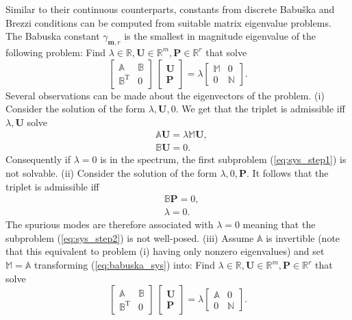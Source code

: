 \documentclass[a4paper,10pt]{article}
\newcommand{\R}{\ensuremath{\mathbb{R}}}
\newcommand{\mm}{\ensuremath{\mathbf{m}}}
\newcommand{\Amat}{\ensuremath{\mathbb{A}}}
\newcommand{\Bmat}{\ensuremath{\mathbb{B}}}
\newcommand{\Mmat}{\ensuremath{\mathbb{M}}}
\newcommand{\Nmat}{\ensuremath{\mathbb{N}}}
\newcommand{\Uvec}{\ensuremath{\mathbf{U}}}
\newcommand{\Pvec}{\ensuremath{\mathbf{P}}}
\begin{document}
  Similar to their continuous counterparts, constants from discrete Babu\v ska
  and Brezzi conditions can be computed from suitable matrix eigenvalue
  problems. The Babuska constant $\gamma_{\mm, r}$ is the smallest in magnitude
  eigenvalue of the following problem: Find $\lambda\in\R, \Uvec\in\R^m,
  \Pvec\in\R^r$ that solve
  \begin{equation}
    \label{eq:babuska_sys}
    \begin{bmatrix}
      \mathbb{A} & \mathbb{B} \\
      \mathbb{B}^{\text{T}} & 0
    \end{bmatrix}
    \,
    \begin{bmatrix}
      \mathbf{U} \\
      \mathbf{P}
    \end{bmatrix}
    =
    \lambda
    \begin{bmatrix}
      \Mmat & 0\\
      0 & \Nmat
    \end{bmatrix}.
  \end{equation}
  Several observations can be made about the eigenvectors of the problem. (i)
  Consider the solution of the form $\lambda, \Uvec, 0$. We get that the
  triplet is admissible iff $\lambda, \Uvec$ solve
  \[
    \begin{aligned}
      &\Amat\Uvec = \lambda\Mmat\Uvec,\\
      &\Bmat\Uvec = 0.
    \end{aligned}
  \]
  Consequently if $\lambda=0$ is in the spectrum, the first subproblem
  (\ref{eq:sys_step1}) is not solvable. (ii) Consider the solution of the form
  $\lambda, 0, \Pvec$. It follows that the triplet is admissible iff
  \[
    \begin{aligned}
      &\Bmat\Pvec = 0,\\
      &\lambda = 0. 
    \end{aligned}
  \]
  The spurious modes are therefore associated with $\lambda=0$ meaning that
  the subproblem (\ref{eq:sys_step2}) is not well-posed.
  (iii) Assume $\Amat$ is invertible (note that this equivalent to problem (i)
  having only nonzero eigenvalues) and set $\Mmat=\Amat$ transforming
  (\ref{eq:babuska_sys}) into: Find $\lambda\in\R, \Uvec\in\R^m, \Pvec\in\R^r$
  that solve
  \[
    \begin{bmatrix}
      \mathbb{A} & \mathbb{B} \\
      \mathbb{B}^{\text{T}} & 0
    \end{bmatrix}
    \,
    \begin{bmatrix}
      \mathbf{U} \\
      \mathbf{P}
    \end{bmatrix}
    =
    \lambda
    \begin{bmatrix}
      \Amat & 0\\
      0 & \Nmat
    \end{bmatrix}.
  \]
\end{document}
